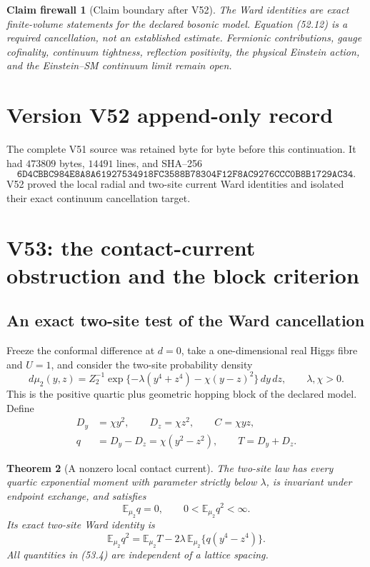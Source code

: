\documentclass[11pt]{article}
\newtheorem{theorem}{Theorem}[section]
\newtheorem{firewall}[theorem]{Claim firewall}
\theoremstyle{remark}
\begin{document}
\begin{firewall}[Claim boundary after V52]
\label{fire:v17v52}
The Ward identities are exact finite-volume statements for the
declared bosonic model.  Equation (52.12) is a required cancellation,
not an established estimate.  Fermionic contributions, gauge
cofinality, continuum tightness, reflection positivity, the physical
Einstein action, and the Einstein--SM continuum limit remain open.
\end{firewall}

\section*{Version V52 append-only record}
The complete V51 source was retained byte for byte before this
continuation.  It had \(473809\) bytes, \(14491\) lines, and SHA--256
\[
 \texttt{6D4CBBC984E8A8A61927534918FC3588B78304F12F8AC9276CCC0B8B1729AC34}.
\]
V52 proved the local radial and two-site current Ward identities and
isolated their exact continuum cancellation target.


\section{V53: the contact-current obstruction and the block criterion}
\label{sec:v17v53}

\subsection{An exact two-site test of the Ward cancellation}

Freeze the conformal difference at \(d=0\), take a one-dimensional real
Higgs fibre and \(U=1\), and consider the two-site probability density
\[
 d\mu_2(y,z)
 =
 Z_2^{-1}
 \exp\{-\lambda(y^4+z^4)-\chi(y-z)^2\}\,dy\,dz,
 \qquad \lambda,\chi>0.                           \tag{53.1}
\]
This is the positive quartic plus geometric hopping block of the
declared model.  Define
\[
\begin{aligned}
 D_y&=\chi y^2,\qquad D_z=\chi z^2,\qquad
 C=\chi yz,\\
 q&=D_y-D_z=\chi(y^2-z^2),\qquad
 T=D_y+D_z.                                      \tag{53.2}
\end{aligned}
\]

\begin{theorem}[A nonzero local contact current]
\label{thm:v17v53-contact}
The two-site law has every quartic exponential moment with parameter
strictly below \(\lambda\), is invariant under endpoint exchange, and
satisfies
\[
 \mathbb E_{\mu_2}q=0,\qquad
 0<\mathbb E_{\mu_2}q^2<\infty.                   \tag{53.3}
\]
Its exact two-site Ward identity is
\[
\boxed{
 \mathbb E_{\mu_2}q^2
 =
 \mathbb E_{\mu_2}T
 -2\lambda\,
 \mathbb E_{\mu_2}
 \{q(y^4-z^4)\}.}                                 \tag{53.4}
\]
All quantities in (53.4) are independent of a lattice spacing.
\end{theorem}
\end{document}
